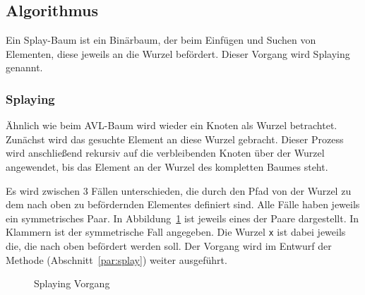 \subsection{Algorithmus}\label{subsec:splay-algorithmus}
Ein Splay-Baum ist ein Binärbaum, der beim Einfügen und Suchen von Elementen, diese jeweils an
die Wurzel befördert.
Dieser Vorgang wird Splaying genannt.

\subsubsection{Splaying}
Ähnlich wie beim AVL-Baum wird wieder ein Knoten als Wurzel betrachtet.
Zunächst wird das gesuchte Element an diese Wurzel gebracht.
Dieser Prozess wird anschließend rekursiv auf die verbleibenden Knoten über der Wurzel angewendet,
bis das Element an der Wurzel des kompletten Baumes steht.

Es wird zwischen 3 Fällen unterschieden, die durch den Pfad von der Wurzel zu dem nach oben
zu befördernden Elementes definiert sind.
Alle Fälle haben jeweils ein symmetrisches Paar.
In Abbildung~\ref{fig:splayinCase} ist jeweils eines der Paare dargestellt.
In Klammern ist der symmetrische Fall angegeben.
Die Wurzel \verb|x| ist dabei jeweils die, die nach oben befördert werden soll.
Der Vorgang wird im Entwurf der Methode  (Abschnitt~\ref{par:splay})
weiter ausgeführt.

\begin{figure}[hbt]
    \centering
    \qquad
    \qquad
    \caption{Splaying Vorgang}\label{fig:splayinCase}
\end{figure}

